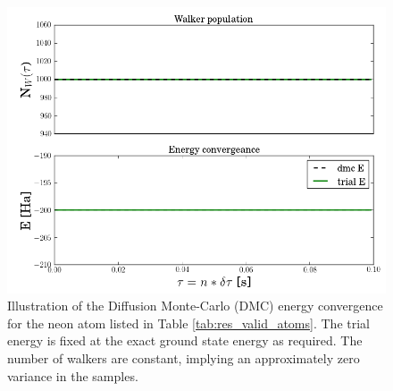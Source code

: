 \begin{figure}[h]
 \begin{center}
  \includegraphics[scale=0.5]{../Graphics/DMC_neon_valid.png}
  \caption{Illustration of the Diffusion Monte-Carlo (DMC) energy convergence for the neon atom listed in Table \ref{tab:res_valid_atoms}. The trial energy is fixed at the exact ground state energy as required. The number of walkers are constant, implying an approximately zero variance in the samples.}
  \label{fig:DMC_neon_nonint}
 \end{center}
\end{figure}

